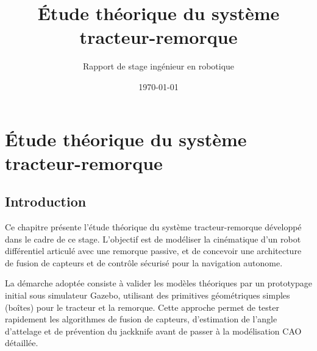\documentclass[a4paper,12pt]{report}
\begin{document}
\title{Étude théorique du système tracteur-remorque}
\author{Rapport de stage ingénieur en robotique}
\date{\today}

\maketitle

\tableofcontents

\chapter{Étude théorique du système tracteur-remorque}
\label{chap:etude_theorique}

\section*{Introduction}

Ce chapitre présente l'étude théorique du système tracteur-remorque développé dans le cadre de ce stage. L'objectif est de modéliser la cinématique d'un robot différentiel articulé avec une remorque passive, et de concevoir une architecture de fusion de capteurs et de contrôle sécurisé pour la navigation autonome.

La démarche adoptée consiste à valider les modèles théoriques par un prototypage initial sous simulateur Gazebo, utilisant des primitives géométriques simples (boîtes) pour le tracteur et la remorque. Cette approche permet de tester rapidement les algorithmes de fusion de capteurs, d'estimation de l'angle d'attelage et de prévention du jackknife avant de passer à la modélisation CAO détaillée.

\begin{center}
\end{center}
\vspace{0.5cm}
\end{document}
